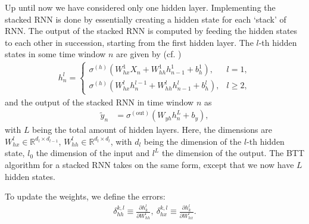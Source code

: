 \documentclass[%
reprint,
amsmath,amssymb,
aps,
]{revtex4-2}
\begin{document}
Up until now we have considered only one hidden layer. Implementing the stacked RNN is done by essentially creating a hidden state for each `stack' of RNN. The output of the stacked RNN is computed by feeding the hidden states to each other in succession, starting from the first hidden layer. The \(l\)-th hidden states in some time window \(n\) are given by (cf. \cite{pascanu2014constructdeeprecurrentneural})
\begin{align}
	h^{l}_{n} = \begin{cases}
		\sigma^{(h)}\left( W_{hx}^{1}X_{n} + W_{hh}^{1}h_{n-1}^{1} + b_{h}^{1}\right), &l=1, \\
		\sigma^{(h)}\left( W_{hx}^{l}h_{n}^{l-1} + W_{hh}^{l}h_{n-1}^{l} + b_{h}^{l}\right), &l\geq 2,
	\end{cases}
\end{align}	
and the output of the stacked RNN in time window \(n\) as
\begin{align}
	\tilde{y}_{n} &= \sigma^{(\text{out})}\left( W_{yh}h^{L}_{n} + b_{y} \right),
\end{align}
with \(L\) being the total amount of hidden layers. 
Here, the dimensions are \(W^{l}_{hx}\in\mathbb{R}^{d_{l}\times d_{l-1}}\), \(W^{l}_{hh}\in\mathbb{R}^{d_{l}\times d_{l}}\), with \(d_l\) being the dimension of the \(l\)-th hidden state, \(l_0\) the dimension of the input and \(l^{L}\) the dimension of the output. The BTT algorithm for a stacked RNN takes on the same form, except that we now have \(L\) hidden states. 


To update the weights, we define the errors:
\begin{align}
	\delta^{k,l}_{hh}\equiv \frac{\partial h_{k}^{l}}{\partial W_{hh}^{l}}, \ \delta^{k,l}_{hx}\equiv \frac{\partial h_{k}^{l}}{\partial W_{hx}^{l}}.
\end{align}
\end{document}
